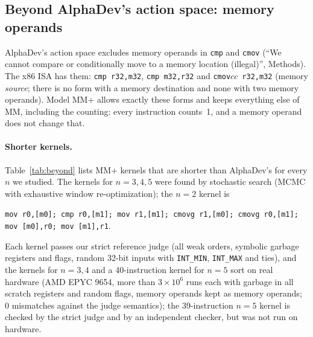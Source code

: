 \subsection{Beyond AlphaDev's action space: memory operands}\label{sec:beyond}

AlphaDev's action space excludes memory operands in \texttt{cmp} and \texttt{cmov} (``We cannot compare or conditionally move
to a memory location (illegal)'', Methods). The x86 ISA has them: \texttt{cmp r32,m32}, \texttt{cmp m32,r32} and
\texttt{cmov}$cc$\texttt{ r32,m32} (memory \emph{source}; there is no form with a memory destination and none with two memory
operands). Model MM+ allows exactly these forms and keeps everything else of MM, including the counting: every instruction
counts~1, and a memory operand does not change that.

\paragraph{Shorter kernels.} Table~\ref{tab:beyond} lists MM+ kernels that are shorter than AlphaDev's for every $n$ we
studied. The kernels for $n = 3, 4, 5$ were found by stochastic search (MCMC with exhaustive window re-optimization); the
$n = 2$ kernel is
\begin{center}\small
\texttt{mov r0,[m0]; cmp r0,[m1]; mov r1,[m1]; cmovg r1,[m0]; cmovg r0,[m1]; mov [m0],r0; mov [m1],r1}.
\end{center}
Each kernel passes our strict reference judge (all weak orders, symbolic garbage registers and flags, random 32-bit inputs
with \texttt{INT\_MIN}, \texttt{INT\_MAX} and ties), and the kernels for $n = 3, 4$ and a 40-instruction kernel for
$n = 5$ sort on real hardware (AMD EPYC 9654, more than $3 \times 10^6$ runs each with garbage in all scratch registers and random flags, memory operands kept as memory
operands; 0 mismatches against the judge semantics); the 39-instruction $n = 5$ kernel is checked by the strict judge and by
an independent checker, but was not run on hardware.

